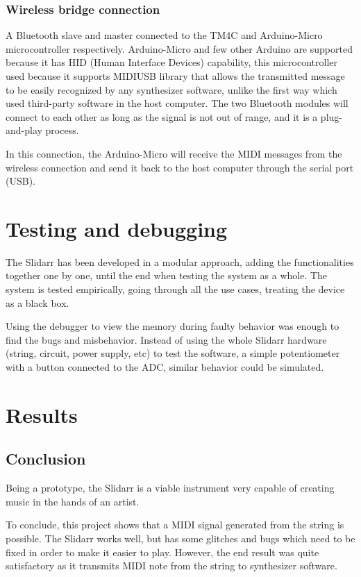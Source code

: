 \documentclass{article}
\begin{document}
\subsubsection{Wireless bridge connection}
A Bluetooth slave and master connected to the TM4C and Arduino-Micro microcontroller respectively. Arduino-Micro and few other Arduino are supported because it has HID (Human Interface Devices) capability, this microcontroller used because it supports MIDIUSB library \cite{arduinolibraries} that allows the transmitted message to be easily recognized by any synthesizer software, unlike the first way which used third-party software in the host computer. The two Bluetooth modules will connect to each other as long as the signal is not out of range, and it is a plug-and-play process.

In this connection, the Arduino-Micro will receive the MIDI messages from the wireless connection and send it back to the host computer through the serial port (USB). 

\section{Testing and debugging}
The Slidarr has been developed in a modular approach, adding the functionalities together one by one, until the end when testing the system as a whole. The system is tested empirically, going through all the use cases, treating the device as a black box.

Using the debugger to view the memory during faulty behavior was enough to find the bugs and misbehavior. Instead of using the whole Slidarr hardware (string, circuit, power supply, etc) to test the software, a simple potentiometer with a button connected to the ADC, similar behavior could be simulated.

\section{Results}

\subsection{Conclusion}
Being a prototype, the Slidarr is a viable instrument very capable of creating music in the hands of an artist.

To conclude, this project shows that a MIDI signal generated from the string is possible.
The Slidarr works well, but has some glitches and bugs which need to be fixed in order to make it easier to play. However, the end result was quite satisfactory as it transmits MIDI note from the string to synthesizer software.
\end{document}
